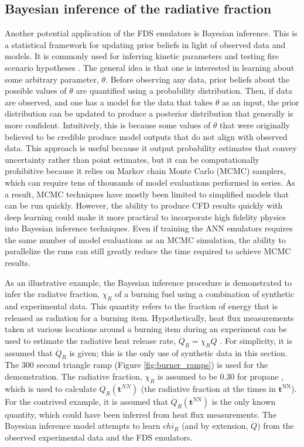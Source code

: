 \documentclass{article}
\begin{document}
\subsection{Bayesian inference of the radiative fraction}
Another potential application of the FDS emulators is Bayesian inference. This is a statistical framework for updating prior beliefs in light of observed data and models. It is commonly used for inferring kinetic parameters \cite{bruns2016inferring} and testing fire scenario hypotheses \cite{overholt2015quantitative}. The general idea is that one is interested in learning about some arbitrary parameter, $\theta$. Before observing any data, prior beliefs about the possible values of $\theta$ are quantified using a probability distribution. Then, if data are observed, and one has a model for the data that takes $\theta$ as an input, the prior distribution can be updated to produce a posterior distribution that generally is more confident. Intuitively, this is because some values of $\theta$ that were originally believed to be credible produce model outputs that do not align with observed data. This approach is useful because it output probability estimates that convey uncertainty rather than point estimates, but it can be computationally prohibitive because it relies on Markov chain Monte Carlo (MCMC) samplers, which can require tens of thousands of model evaluations performed in series. As a result, MCMC techniques have mostly been limited to simplified models that can be run quickly. However, the ability to produce CFD results quickly with deep learning could make it more practical to incorporate high fidelity physics into Bayesian inference techniques. Even if training the ANN emulators requires the same number of model evaluations as an MCMC simulation, the ability to parallelize the runs can still greatly reduce the time required to achieve MCMC results. 

As an illustrative example, the Bayesian inference procedure is demonstrated to infer the radiatve fraction, $\chi_R$ of a burning fuel using a combination of synthetic and experimental data. This quantity refers to the fraction of energy that is released as radiation for a burning item. Hypothetically, heat flux measurements taken at various locations around a burning item during an experiment can be used to estimate the radiative heat release rate, $\dot{Q}_R=\chi_R\dot{Q}$ \cite{koseki1989combustion}. For simplicity, it is assumed that $\dot{Q}_R$ is given; this is the only use of synthetic data in this section. The 300 second triangle ramp (Figure \ref{fig:burner_ramps}) is used for the demonstration. The radiative fraction, $\chi_R$ is assumed to be 0.30 for propane \cite{beyler2016fire}, which is used to calculate $\dot{Q}_R(\boldsymbol{t}^{NN})$ (the radiative fraction at the times in $\boldsymbol{t}^\text{NN}$). For the contrived example, it is assumed that $\dot{Q}_R(\boldsymbol{t}^\text{NN})$ is the only known quantity, which could have been inferred from heat flux measurements. The Bayesian inference model attempts to learn $chi_R$ (and by extension, $\dot{Q}$) from the observed experimental data and the FDS emulators. 
\end{document}
